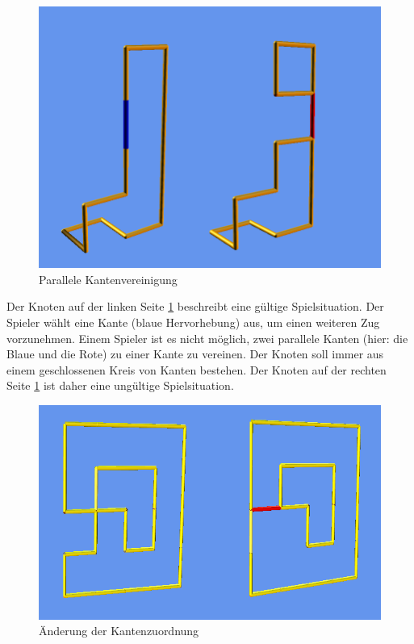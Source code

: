 	\begin{figure}[htb]
	  \centering
	  \includegraphics[width = \textwidth]{Systemmodelle/Ungueltiger_Zug.png}
	  \caption{Parallele Kantenvereinigung}
	  \label{fig:zug1}
	\end{figure}

Der Knoten auf der linken Seite \ref{fig:zug1} beschreibt eine gültige Spielsituation. Der Spieler wählt eine Kante (blaue Hervorhebung) aus, um einen weiteren Zug vorzunehmen.
Einem Spieler ist es nicht möglich, zwei parallele Kanten (hier: die Blaue und die Rote) zu einer Kante zu vereinen. Der Knoten soll immer aus einem geschlossenen Kreis von Kanten bestehen. Der Knoten auf der rechten Seite \ref{fig:zug1} ist daher eine ungültige Spielsituation.

\clearpage

	\begin{figure}[htb]
	  \centering
	  \includegraphics[width = \textwidth]{Systemmodelle/Ungueltiger_Zug2.png}
	  \caption{{\color{red}Änderung der Kantenzuordnung}}
	  \label{fig:zug2}
	\end{figure}
	
